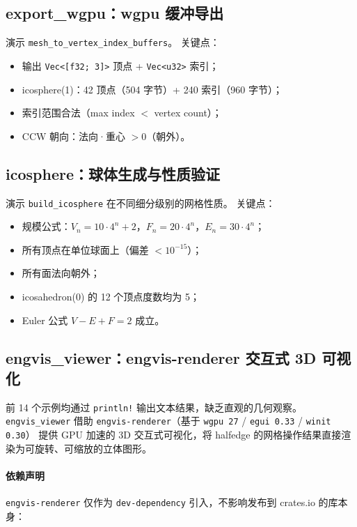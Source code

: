 \documentclass[11pt,a4paper]{article}
\begin{document}
\subsection{export\_wgpu：wgpu 缓冲导出}

演示 \texttt{mesh\_to\_vertex\_index\_buffers}。
关键点：
\begin{itemize}
  \item 输出 \texttt{Vec<[f32; 3]>} 顶点 + \texttt{Vec<u32>} 索引；
  \item icosphere(1)：42 顶点（504 字节）+ 240 索引（960 字节）；
  \item 索引范围合法（max index $<$ vertex count）；
  \item CCW 朝向：法向·重心 $> 0$（朝外）。
\end{itemize}

\subsection{icosphere：球体生成与性质验证}

演示 \texttt{build\_icosphere} 在不同细分级别的网格性质。
关键点：
\begin{itemize}
  \item 规模公式：$V_n = 10 \cdot 4^n + 2$，$F_n = 20 \cdot 4^n$，$E_n = 30 \cdot 4^n$；
  \item 所有顶点在单位球面上（偏差 $< 10^{-15}$）；
  \item 所有面法向朝外；
  \item icosahedron(0) 的 12 个顶点度数均为 5；
  \item Euler 公式 $V - E + F = 2$ 成立。
\end{itemize}

\subsection{engvis\_viewer：engvis-renderer 交互式 3D 可视化}

前 14 个示例均通过 \texttt{println!} 输出文本结果，缺乏直观的几何观察。
\texttt{engvis\_viewer} 借助 \texttt{engvis-renderer}（基于 \texttt{wgpu 27} / \texttt{egui 0.33} / \texttt{winit 0.30}）
提供 GPU 加速的 3D 交互式可视化，将 halfedge 的网格操作结果直接渲染为可旋转、可缩放的立体图形。

\paragraph{依赖声明}
\texttt{engvis-renderer} 仅作为 \texttt{dev-dependency} 引入，不影响发布到 crates.io 的库本身：
\end{document}
